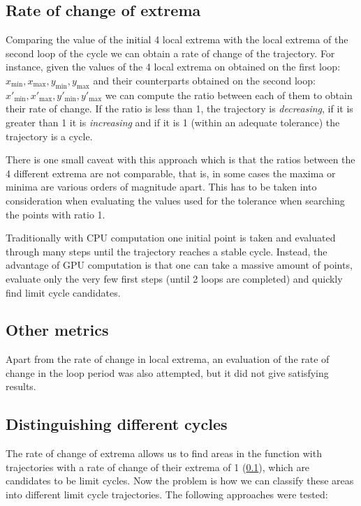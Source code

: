 \pagebreak

\subsection{Rate of change of extrema}%
\label{sub:roc}

Comparing the value of the initial 4 local extrema with the local extrema of the second loop of the cycle we can obtain a rate of change of the trajectory. For instance, given the values of the 4 local extrema on obtained on the first loop: $x_{\min}, x_{\max}, y_{\min}, y_{\max}$ and their counterparts obtained on the second loop: $x'_{\min}, x'_{\max}, y'_{\min}, y'_{\max}$ we can compute the ratio between each of them to obtain their rate of change. If the ratio is less than 1, the trajectory is \emph{decreasing}, if it is greater than 1 it is \emph{increasing} and if it is 1 (within an adequate tolerance) the trajectory is a cycle.

There is one small caveat with this approach which is that the ratios between the 4 different extrema are not comparable, that is, in some cases the maxima or minima are various orders of magnitude apart. This has to be taken into consideration when evaluating the values used for the tolerance when searching the points with ratio 1.

Traditionally with CPU computation one initial point is taken and evaluated through many steps until the trajectory reaches a stable cycle. Instead, the advantage of GPU computation is that one can take a massive amount of points, evaluate only the very few first steps (until 2 loops are completed) and quickly find limit cycle candidates.

\subsection{Other metrics}

Apart from the rate of change in local extrema, an evaluation of the rate of
change in the loop period was also attempted, but it did not give satisfying
results.

\subsection{Distinguishing different cycles}

The rate of change of extrema allows us to find areas in the function with
trajectories with a rate of change of their extrema of 1 (\cref{sub:roc}),
which are candidates to be limit cycles. Now the problem is how we can classify
these areas into different limit cycle trajectories. The following approaches
were tested:

